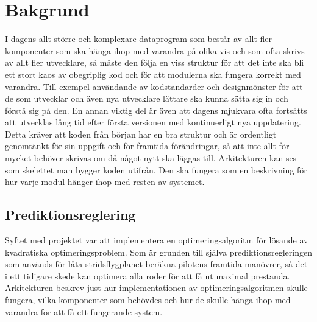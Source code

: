 \section{Bakgrund}
I dagens allt större och komplexare dataprogram som består av allt fler komponenter som ska hänga ihop med varandra på olika vis och som ofta skrivs av allt fler utvecklare, så måste den följa en viss struktur för att det inte ska bli ett stort kaos av obegriplig kod och för att modulerna ska fungera korrekt med varandra. Till exempel användande av kodstandarder och designmönster för att de som utvecklar och även nya utvecklare lättare ska kunna sätta sig in och förstå sig på den.
\newline
\newline
En annan viktig del är även att dagens mjukvara ofta fortsätts att utvecklas lång tid efter första versionen med kontinuerligt nya uppdatering. Detta kräver att koden från början har en bra struktur och är ordentligt genomtänkt för sin uppgift och för framtida förändringar, så att inte allt för mycket behöver skrivas om då något nytt ska läggas till.
\newline
\newline
Arkitekturen kan ses som skelettet man bygger koden utifrån. Den ska fungera som en beskrivning för hur varje modul hänger ihop med resten av systemet.

\subsection{Prediktionsreglering}
Syftet med projektet var att implementera en optimeringsalgoritm för lösande av kvadratiska optimeringsproblem. Som är grunden till själva prediktionsregleringen som används för låta stridsflygplanet beräkna pilotens framtida manövrer, så det i ett tidigare skede kan optimera alla roder för att få ut maximal prestanda.
\newline
\newline
Arkitekturen beskrev just hur implementationen av optimeringsalgoritmen skulle fungera, vilka komponenter som behövdes och hur de skulle hänga ihop med varandra för att få ett fungerande system.

